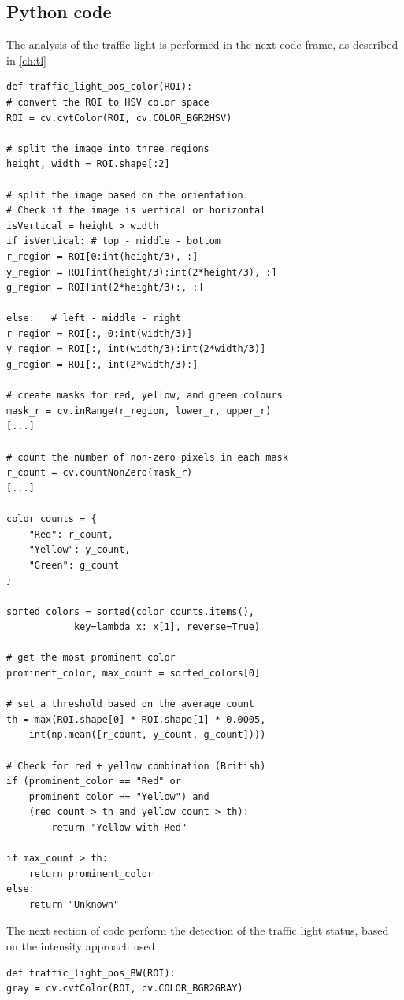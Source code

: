\documentclass[10pt,conference,a4paper]{IEEEtran}
\begin{document}
\begin{appendices}
\section{Python code}
The analysis of the traffic light is performed in the next code frame, as described in \ref{ch:tl}
\begin{verbatim}
def traffic_light_pos_color(ROI):
# convert the ROI to HSV color space
ROI = cv.cvtColor(ROI, cv.COLOR_BGR2HSV)

# split the image into three regions
height, width = ROI.shape[:2]

# split the image based on the orientation. 
# Check if the image is vertical or horizontal
isVertical = height > width
if isVertical: # top - middle - bottom
r_region = ROI[0:int(height/3), :]
y_region = ROI[int(height/3):int(2*height/3), :]
g_region = ROI[int(2*height/3):, :]

else:   # left - middle - right
r_region = ROI[:, 0:int(width/3)]
y_region = ROI[:, int(width/3):int(2*width/3)]
g_region = ROI[:, int(2*width/3):]

# create masks for red, yellow, and green colours
mask_r = cv.inRange(r_region, lower_r, upper_r)
[...]

# count the number of non-zero pixels in each mask
r_count = cv.countNonZero(mask_r)
[...]

color_counts = {
    "Red": r_count,
    "Yellow": y_count,
    "Green": g_count
}

sorted_colors = sorted(color_counts.items(),  
            key=lambda x: x[1], reverse=True)
 
# get the most prominent color
prominent_color, max_count = sorted_colors[0]

# set a threshold based on the average count
th = max(ROI.shape[0] * ROI.shape[1] * 0.0005,
    int(np.mean([r_count, y_count, g_count])))

# Check for red + yellow combination (British)
if (prominent_color == "Red" or 
    prominent_color == "Yellow") and 
    (red_count > th and yellow_count > th):
        return "Yellow with Red"

if max_count > th:
    return prominent_color
else:
    return "Unknown"
\end{verbatim}
The next section of code perform the detection of the traffic light status, based on the intensity approach used
\begin{verbatim}
def traffic_light_pos_BW(ROI):
gray = cv.cvtColor(ROI, cv.COLOR_BGR2GRAY)


\end{verbatim}
\end{appendices}
\end{document}
